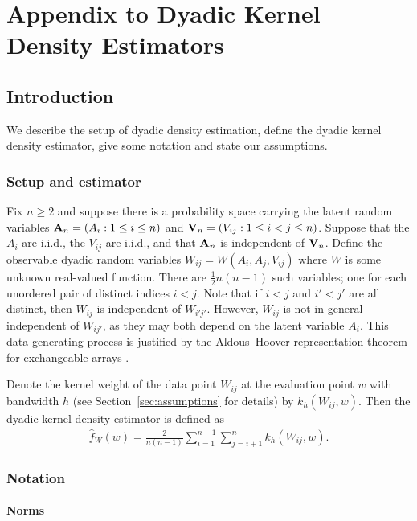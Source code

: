 \chapter{Appendix to Dyadic Kernel Density Estimators}

\section{Introduction}

We describe the setup of
dyadic density estimation,
define the dyadic kernel density estimator,
give some notation
and state our assumptions.

\subsection{Setup and estimator}

Fix $n \geq 2$ and suppose there is
a probability space carrying the latent random variables
$\mathbf{A}_n=(A_i: 1\leq i\leq n)$ and $\mathbf{V}_n=(V_{ij}: 1\leq i<j\leq n)$.
Suppose that the $A_i$ are i.i.d., the $V_{ij}$ are i.i.d., and
that $\mathbf{A}_n$ is independent of $\mathbf{V}_n$.
Define the observable dyadic random variables
$W_{ij} = W(A_i, A_j, V_{ij})$
where $W$ is some unknown real-valued function.
There are $\frac{1}{2}n(n-1)$ such variables;
one for each unordered pair of distinct indices $i<j$.
Note that if $i<j$ and $i'<j'$ are all distinct,
then $W_{ij}$ is independent of $W_{i' j'}$.
However, $W_{ij}$ is
not in general independent of $W_{ij'}$,
as they may both depend on the latent variable $A_i$.
This data generating process is justified by the
Aldous--Hoover representation theorem for exchangeable arrays
\citep{aldous1981representations, hoover1979relations}.

Denote the kernel weight of the data point $W_{ij}$
at the evaluation point $w$
with bandwidth $h$
(see Section~\ref{sec:assumptions} for details)
by
$k_h(W_{ij}, w)$.
Then the dyadic
kernel density estimator
is defined as
\begin{align*}
  \hat f_W(w) = \frac{2}{n(n-1)}
  \sum_{i=1}^{n-1} \sum_{j=i+1}^{n} k_h(W_{ij}, w).
\end{align*}

\subsection{Notation}

\subsubsection{Norms}


